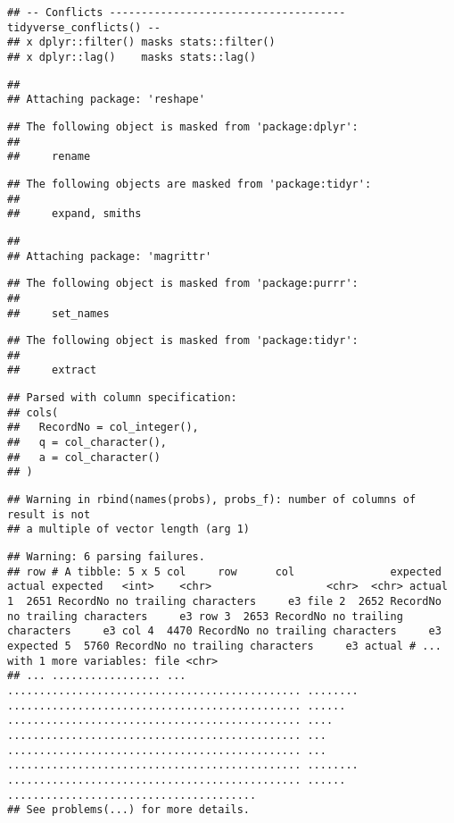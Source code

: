 \documentclass[]{article}
\begin{document}
\begin{verbatim}
## -- Conflicts ------------------------------------- tidyverse_conflicts() --
## x dplyr::filter() masks stats::filter()
## x dplyr::lag()    masks stats::lag()
\end{verbatim}

\begin{verbatim}
## 
## Attaching package: 'reshape'
\end{verbatim}

\begin{verbatim}
## The following object is masked from 'package:dplyr':
## 
##     rename
\end{verbatim}

\begin{verbatim}
## The following objects are masked from 'package:tidyr':
## 
##     expand, smiths
\end{verbatim}

\begin{verbatim}
## 
## Attaching package: 'magrittr'
\end{verbatim}

\begin{verbatim}
## The following object is masked from 'package:purrr':
## 
##     set_names
\end{verbatim}

\begin{verbatim}
## The following object is masked from 'package:tidyr':
## 
##     extract
\end{verbatim}

\begin{verbatim}
## Parsed with column specification:
## cols(
##   RecordNo = col_integer(),
##   q = col_character(),
##   a = col_character()
## )
\end{verbatim}

\begin{verbatim}
## Warning in rbind(names(probs), probs_f): number of columns of result is not
## a multiple of vector length (arg 1)
\end{verbatim}

\begin{verbatim}
## Warning: 6 parsing failures.
## row # A tibble: 5 x 5 col     row      col               expected actual expected   <int>    <chr>                  <chr>  <chr> actual 1  2651 RecordNo no trailing characters     e3 file 2  2652 RecordNo no trailing characters     e3 row 3  2653 RecordNo no trailing characters     e3 col 4  4470 RecordNo no trailing characters     e3 expected 5  5760 RecordNo no trailing characters     e3 actual # ... with 1 more variables: file <chr>
## ... ................. ... .............................................. ........ .............................................. ...... .............................................. .... .............................................. ... .............................................. ... .............................................. ........ .............................................. ...... .......................................
## See problems(...) for more details.
\end{verbatim}
\end{document}

